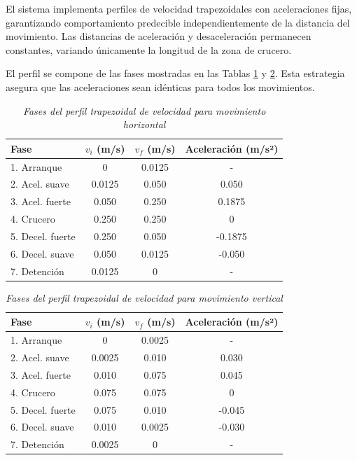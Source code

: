 El sistema implementa perfiles de velocidad trapezoidales con aceleraciones fijas, garantizando comportamiento predecible independientemente de la distancia del movimiento. Las distancias de aceleración y desaceleración permanecen constantes, variando únicamente la longitud de la zona de crucero.

El perfil se compone de las fases mostradas en las Tablas \ref{tab:perfil_horizontal} y \ref{tab:perfil_vertical}. Esta estrategia asegura que las aceleraciones sean idénticas para todos los movimientos.

\begin{table}[H]
\centering
\small
\begin{tabular}{|l|c|c|c|}
\hline
\textbf{Fase} & \textbf{$v_i$ (m/s)} & \textbf{$v_f$ (m/s)} & \textbf{Aceleración (m/s²)} \\
\hline
1. Arranque & 0 & 0.0125 & - \\
\hline
2. Acel. suave & 0.0125 & 0.050 & 0.050 \\
\hline
3. Acel. fuerte & 0.050 & 0.250 & 0.1875 \\
\hline
4. Crucero & 0.250 & 0.250 & 0 \\
\hline
5. Decel. fuerte & 0.250 & 0.050 & -0.1875 \\
\hline
6. Decel. suave & 0.050 & 0.0125 & -0.050 \\
\hline
7. Detención & 0.0125 & 0 & - \\
\hline
\end{tabular}
\caption{\textit{Fases del perfil trapezoidal de velocidad para movimiento horizontal}}
\label{tab:perfil_horizontal}
\end{table}

\begin{table}[H]
\centering
\small
\begin{tabular}{|l|c|c|c|}
\hline
\textbf{Fase} & \textbf{$v_i$ (m/s)} & \textbf{$v_f$ (m/s)} & \textbf{Aceleración (m/s²)} \\
\hline
1. Arranque & 0 & 0.0025 & - \\
\hline
2. Acel. suave & 0.0025 & 0.010 & 0.030 \\
\hline
3. Acel. fuerte & 0.010 & 0.075 & 0.045 \\
\hline
4. Crucero & 0.075 & 0.075 & 0 \\
\hline
5. Decel. fuerte & 0.075 & 0.010 & -0.045 \\
\hline
6. Decel. suave & 0.010 & 0.0025 & -0.030 \\
\hline
7. Detención & 0.0025 & 0 & - \\
\hline
\end{tabular}
\caption{\textit{Fases del perfil trapezoidal de velocidad para movimiento vertical}}
\label{tab:perfil_vertical}
\end{table}

